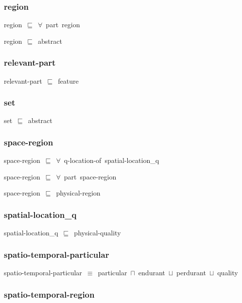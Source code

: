 \documentclass{article}
\begin{document}
\subsubsection*{region}

region~\ensuremath{\sqsubseteq}~\ensuremath{\forall}~part~region~

region~\ensuremath{\sqsubseteq}~abstract~

\subsubsection*{relevant-part}

relevant-part~\ensuremath{\sqsubseteq}~feature~

\subsubsection*{set}

set~\ensuremath{\sqsubseteq}~abstract~

\subsubsection*{space-region}

space-region~\ensuremath{\sqsubseteq}~\ensuremath{\forall}~q-location-of~spatial-location\_q~

space-region~\ensuremath{\sqsubseteq}~\ensuremath{\forall}~part~space-region~

space-region~\ensuremath{\sqsubseteq}~physical-region~

\subsubsection*{spatial-location_q}

spatial-location\_q~\ensuremath{\sqsubseteq}~physical-quality~

\subsubsection*{spatio-temporal-particular}

spatio-temporal-particular~\ensuremath{\equiv}~particular~\ensuremath{\sqcap}~endurant~\ensuremath{\sqcup}~perdurant~\ensuremath{\sqcup}~quality

\subsubsection*{spatio-temporal-region}
\end{document}

